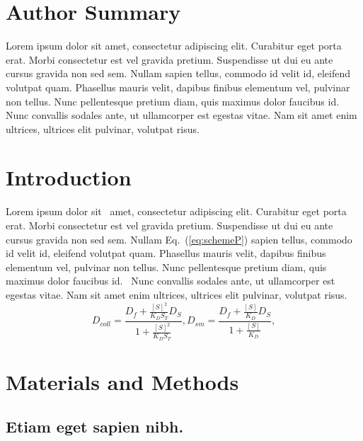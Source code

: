 \section*{Author Summary}
Lorem ipsum dolor sit amet, consectetur adipiscing elit. Curabitur eget porta erat. Morbi consectetur est vel gravida pretium. Suspendisse ut dui eu ante cursus gravida non sed sem. Nullam sapien tellus, commodo id velit id, eleifend volutpat quam. Phasellus mauris velit, dapibus finibus elementum vel, pulvinar non tellus. Nunc pellentesque pretium diam, quis maximus dolor faucibus id. Nunc convallis sodales ante, ut ullamcorper est egestas vitae. Nam sit amet enim ultrices, ultrices elit pulvinar, volutpat risus.

\linenumbers

\section*{Introduction}
Lorem ipsum dolor sit~\cite{bib1} amet, consectetur adipiscing elit. Curabitur eget porta erat. Morbi consectetur est vel gravida pretium. Suspendisse ut dui eu ante cursus gravida non sed sem. Nullam Eq.~(\ref{eq:schemeP}) sapien tellus, commodo id velit id, eleifend volutpat quam. Phasellus mauris velit, dapibus finibus elementum vel, pulvinar non tellus. Nunc pellentesque pretium diam, quis maximus dolor faucibus id.~\cite{bib2} Nunc convallis sodales ante, ut ullamcorper est egestas vitae. Nam sit amet enim ultrices, ultrices elit pulvinar, volutpat risus.
\begin{equation}\label{eq:schemeP}
D_{coll} = \frac{D_f+\frac{[S]^2}{K_D S_T} D_S} {1+\frac{[S]^2}{K_D S_T}},
D_{sm} = \frac{D_f+ \frac{[S]}{K_D} D_S}{1+\frac{[S]}{K_D}},
\end{equation}



\section*{Materials and Methods}
\subsection*{Etiam eget sapien nibh.}

